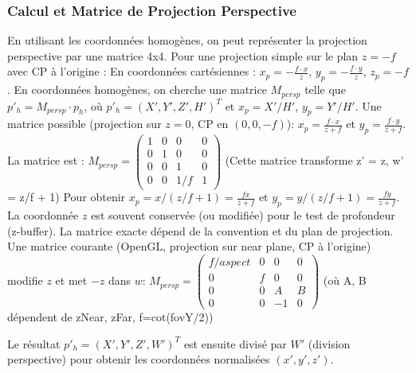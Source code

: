 \documentclass{article}
\begin{document}
\subsubsection{Calcul et Matrice de Projection Perspective}
En utilisant les coordonnées homogènes, on peut représenter la projection perspective par une matrice 4x4. Pour une projection simple sur le plan $z=-f$ avec CP à l'origine :
En coordonnées cartésiennes : $x_p = - \frac{f \cdot x}{z}$, $y_p = - \frac{f \cdot y}{z}$, $z_p = -f$.
En coordonnées homogènes, on cherche une matrice $M_{persp}$ telle que $p'_h = M_{persp} \cdot p_h$, où $p'_h = (X', Y', Z', H')^T$ et $x_p = X'/H'$, $y_p = Y'/H'$.
Une matrice possible (projection sur $z=0$, CP en $(0,0,-f)$):
$x_p = \frac{f \cdot x}{z+f}$ et $y_p = \frac{f \cdot y}{z+f}$.
La matrice est :
$M_{persp} = \begin{pmatrix} 1 & 0 & 0 & 0 \\ 0 & 1 & 0 & 0 \\ 0 & 0 & 1 & 0 \\ 0 & 0 & 1/f & 1 \end{pmatrix}$ (Cette matrice transforme z' = z, w' = z/f + 1)
Pour obtenir $x_p = x / (z/f+1) = \frac{f x}{z+f}$ et $y_p = y / (z/f+1) = \frac{f y}{z+f}$.
La coordonnée $z$ est souvent conservée (ou modifiée) pour le test de profondeur (z-buffer). La matrice exacte dépend de la convention et du plan de projection.
Une matrice courante (OpenGL, projection sur near plane, CP à l'origine) modifie $z$ et met $-z$ dans $w$:
$M_{persp} = \begin{pmatrix} f/aspect & 0 & 0 & 0 \\ 0 & f & 0 & 0 \\ 0 & 0 & A & B \\ 0 & 0 & -1 & 0 \end{pmatrix}$ (où A, B dépendent de zNear, zFar, f=cot(fovY/2))

Le résultat $p'_h = (X', Y', Z', W')^T$ est ensuite divisé par $W'$ (division perspective) pour obtenir les coordonnées normalisées $(x', y', z')$.
\end{document}

